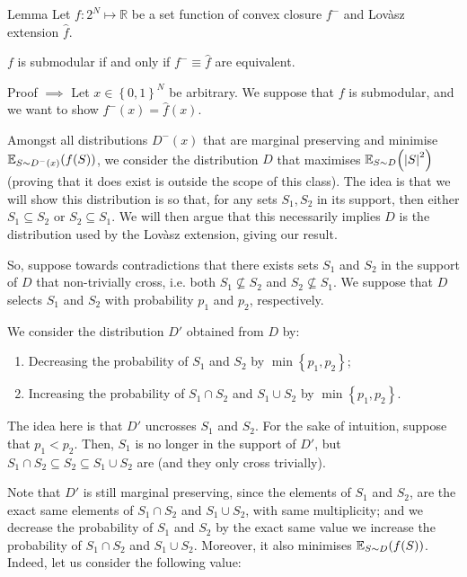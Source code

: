 \documentclass[a4paper]{article}
\begin{document}
\begin{parag}{Lemma}
    Let $f: 2^N \mapsto \mathbb{R}$ be a set function of convex closure $f^-$ and Lovàsz extension $\hat{f}$.

    $f$ is submodular if and only if $f^- \equiv \hat{f}$ are equivalent.

    \begin{subparag}{Proof $\implies$}
        Let $x \in \left\{0, 1\right\}^N$ be arbitrary. We suppose that $f$ is submodular, and we want to show $f^-\left(x\right) = \hat{f}\left(x\right)$. 

        Amongst all distributions $D^-\left(x\right)$ that are marginal preserving and minimise $\exval_{S \followsdistr D^-\left(x\right)}\left(f\left(S\right)\right)$, we consider the distribution $D$ that maximises $\exval_{S \followsdistr D}\left(\left|S\right|^2\right)$ (proving that it does exist is outside the scope of this class). The idea is that we will show this distribution is so that, for any sets $S_1, S_2$ in its support, then either $S_1 \subseteq S_2$ or $S_2 \subseteq S_1$. We will then argue that this necessarily implies $D$ is the distribution used by the Lovàsz extension, giving our result. 

        So, suppose towards contradictions that there exists sets $S_1$ and $S_2$ in the support of $D$ that non-trivially cross, i.e. both $S_1 \not\subseteq S_2$ and $S_2 \not \subseteq S_1$. We suppose that $D$ selects $S_1$ and $S_2$ with probability $p_1$ and $p_2$, respectively.

        We consider the distribution $D'$ obtained from $D$ by:
        \begin{enumerate}
            \item Decreasing the probability of $S_1$ and $S_2$ by $\min\left\{p_1, p_2\right\}$;
            \item Increasing the probability of $S_1 \cap S_2$ and $S_1 \cup S_2$ by $\min\left\{p_1, p_2\right\}$.
        \end{enumerate}

        The idea here is that $D'$ uncrosses $S_1$ and $S_2$. For the sake of intuition, suppose that $p_1 < p_2$. Then, $S_1$ is no longer in the support of $D'$, but $S_1 \cap S_2 \subseteq S_2 \subseteq S_1 \cup S_2$ are (and they only cross trivially). 

        Note that $D'$ is still marginal preserving, since the elements of $S_1$ and $S_2$, are the exact same elements of $S_1 \cap S_2$ and $S_1 \cup S_2$, with same multiplicity; and we decrease the probability of $S_1$ and $S_2$ by the exact same value we increase the probability of $S_1 \cap S_2$ and $S_1 \cup S_2$. Moreover, it also minimises $\exval_{S \followsdistr D}\left(f\left(S\right)\right)$. Indeed, let us consider the following value:
        

\end{subparag}
\end{parag}
\end{document}
